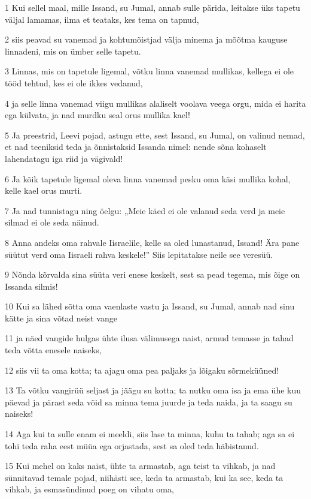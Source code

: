 \par 1 Kui sellel maal, mille Issand, su Jumal, annab sulle pärida, leitakse üks tapetu väljal lamamas, ilma et teataks, kes tema on tapnud,
\par 2 siis peavad su vanemad ja kohtumõistjad välja minema ja mõõtma kauguse linnadeni, mis on ümber selle tapetu.
\par 3 Linnas, mis on tapetule ligemal, võtku linna vanemad mullikas, kellega ei ole tööd tehtud, kes ei ole ikkes vedanud,
\par 4 ja selle linna vanemad viigu mullikas alaliselt voolava veega orgu, mida ei harita ega külvata, ja nad murdku seal orus mullika kael!
\par 5 Ja preestrid, Leevi pojad, astugu ette, sest Issand, su Jumal, on valinud nemad, et nad teeniksid teda ja õnnistaksid Issanda nimel: nende sõna kohaselt lahendatagu iga riid ja vägivald!
\par 6 Ja kõik tapetule ligemal oleva linna vanemad pesku oma käsi mullika kohal, kelle kael orus murti.
\par 7 Ja nad tunnistagu ning öelgu: „Meie käed ei ole valanud seda verd ja meie silmad ei ole seda näinud.
\par 8 Anna andeks oma rahvale Iisraelile, kelle sa oled lunastanud, Issand! Ära pane süütut verd oma Iisraeli rahva keskele!” Siis lepitatakse neile see veresüü.
\par 9 Nõnda kõrvalda sina süüta veri enese keskelt, sest sa pead tegema, mis õige on Issanda silmis!
\par 10 Kui sa lähed sõtta oma vaenlaste vastu ja Issand, su Jumal, annab nad sinu kätte ja sina võtad neist vange
\par 11 ja näed vangide hulgas ühte ilusa välimusega naist, armud temasse ja tahad teda võtta enesele naiseks,
\par 12 siis vii ta oma kotta; ta ajagu oma pea paljaks ja lõigaku sõrmeküüned!
\par 13 Ta võtku vangirüü seljast ja jäägu su kotta; ta nutku oma isa ja ema ühe kuu päevad ja pärast seda võid sa minna tema juurde ja teda naida, ja ta saagu su naiseks!
\par 14 Aga kui ta sulle enam ei meeldi, siis lase ta minna, kuhu ta tahab; aga sa ei tohi teda raha eest müüa ega orjastada, sest sa oled teda häbistanud.
\par 15 Kui mehel on kaks naist, ühte ta armastab, aga teist ta vihkab, ja nad sünnitavad temale pojad, niihästi see, keda ta armastab, kui ka see, keda ta vihkab, ja esmasündinud poeg on vihatu oma,
